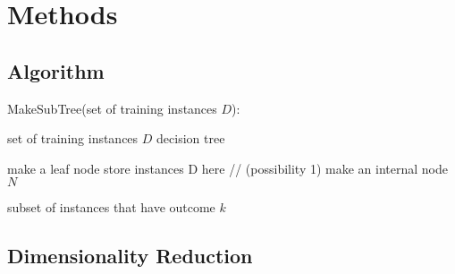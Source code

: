 \section{Methods}
	\subsection{Algorithm}
		\begin{flushleft}
			\item{MakeSubTree(set of training instances $D$)}:
		\end{flushleft}
		\begin{algorithmic}[1]

			\renewcommand{\algorithmicrequire}{\textbf{Input: }}
			\renewcommand{\algorithmicensure}{\textbf{Output:}}
			\REQUIRE set of  training instances $D$
			\ENSURE  decision tree

			\STATE make a leaf node
			\STATE store instances D here // (possibility 1)
			\ELSE
			\STATE make an internal node $N$
			\ENDIF

			 {subset of instances that have outcome $k$}
			\ENDFOR
		\end{algorithmic}
	\subsection{Dimensionality Reduction}
